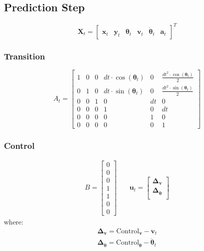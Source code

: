 \subsection{Prediction Step}

$$
  \label{eq:state-transf}
\mathbf{X}_t=
\begin{bmatrix}
\mathbf{x}_t & \mathbf{y}_t & \boldsymbol \theta_t & \mathbf{v}_t & \dot{\boldsymbol \theta}_t & \mathbf{a}_t
\end{bmatrix} ^T
$$

\subsubsection{Transition}
\begin{equation}
A_t
=
\begin{bmatrix}
1 & 0 & 0 & dt \cdot \cos(\boldsymbol \theta_t) & 0 & \frac{dt^2 \cdot \cos(\boldsymbol \theta_t)}{2} \\
0 & 1 & 0 & dt \cdot \sin(\boldsymbol \theta_t)& 0 & \frac{dt^2 \cdot \sin(\boldsymbol \theta_t)}{2} \\
0 & 0 & 1 & 0 & dt & 0 \\
0 & 0 & 0 & 1 & 0 & dt \\
0 & 0 & 0 & 0 & 1 & 0 \\
0 & 0 & 0 & 0 & 0 & 1
\end{bmatrix}
\end{equation}


\subsubsection{Control}
\begin{align}
B
=
    \begin{bmatrix}
    0 \\
    0 \\
    0 \\
    1 \\
    1 \\
    0 \\
    0
    \end{bmatrix}
& \quad
\mathbf{u}_t
=
    \begin{bmatrix}
    \boldsymbol \Delta_{\mathbf{v}}  \\
    \boldsymbol \Delta_{ \dot{\boldsymbol \theta}} \\[0.3em]
    \end{bmatrix}
\end{align}
where:
  \begin{align}
     \boldsymbol \Delta_{\mathbf{v}} = \text{Control}_{\mathbf{v}} - \mathbf{v}_t  \\
    \boldsymbol \Delta_{ \dot{\boldsymbol \theta}} = \text{Control}_{\dot{\boldsymbol \theta}} - \dot{\boldsymbol \theta}_t
  \end{align}

